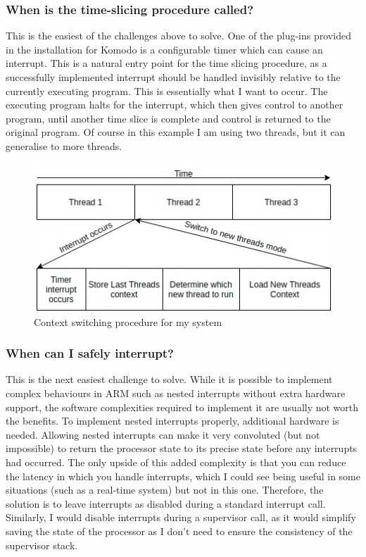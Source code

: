 \subsubsection{When is the time-slicing procedure called?}
This is the easiest of the challenges above to solve. One of the plug-ins provided in the installation for Komodo is a configurable timer which can cause an interrupt. This is a natural entry point for the time slicing procedure, as a successfully implemented interrupt should be handled invisibly relative to the currently executing program. This is essentially what I want to occur. The executing program halts for the interrupt, which then gives control to another program, until another time slice is complete and control is returned to the original program. Of course in this example I am using two threads, but it can generalise to more threads. 
\begin{figure}[ht!]
	\includegraphics[width=\linewidth]{figures/cswitch.png}
	\caption{Context switching procedure for my system}
	\label{fig:cswitch}
\end{figure} 
\subsubsection{When can I safely interrupt?}
This is the next easiest challenge to solve. While it is possible to implement complex behaviours in ARM such as nested interrupts without extra hardware support, the software complexities required to implement it are usually not worth the benefits. To implement nested interrupts properly, additional hardware is needed. Allowing nested interrupts can make it very convoluted (but not impossible) to return the processor state to its precise state before any interrupts had occurred. The only upside of this added complexity is that you can reduce the latency in which you handle interrupts, which I could see being useful in some situations (such as a real-time system) but not in this one. Therefore, the solution is to leave interrupts as disabled during a standard interrupt call. Similarly, I would disable interrupts during a supervisor call, as it would simplify saving the state of the processor as I don't need to ensure the consistency of the supervisor stack.

